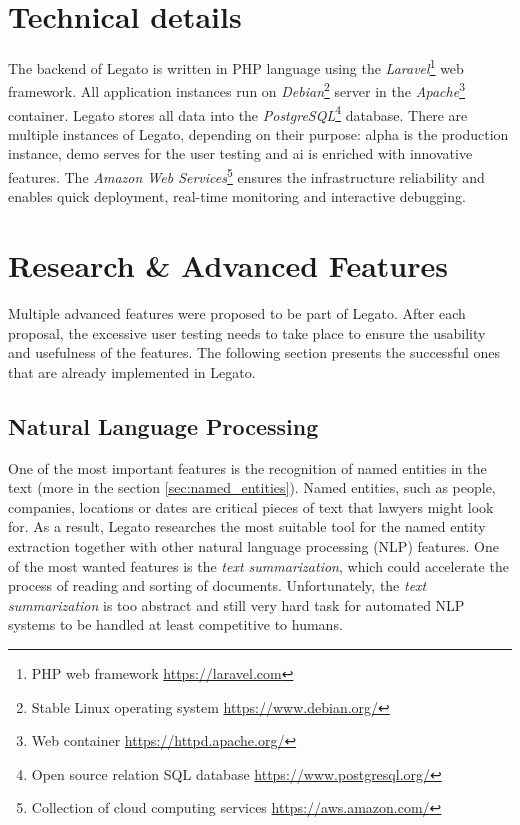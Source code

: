 \documentclass[
  digital, %
  notable,   %
  nolof,     %
  nolot,     %
]{fithesis3}
\begin{document}
\section{Technical details}
The backend of Legato is written in PHP language using the \textit{Laravel}\footnote{PHP web framework \url{https://laravel.com}} web framework.
All application instances run on \textit{Debian}\footnote{Stable Linux operating system \url{https://www.debian.org/}} server in the \textit{Apache}\footnote{Web container \url{https://httpd.apache.org/}} container.
Legato stores all data into the \textit{PostgreSQL}\footnote{Open source relation SQL database \url{https://www.postgresql.org/}} database.
There are multiple instances of Legato, depending on their purpose: alpha is the production instance, demo serves for the user testing and ai is enriched with innovative features.
The \textit{Amazon Web Services}\footnote{Collection of cloud computing services \url{https://aws.amazon.com/}} ensures the infrastructure reliability and enables quick deployment, real-time monitoring and interactive debugging.

\section{Research \& Advanced Features}
\label{sec:legato_advanced}
Multiple advanced features were proposed to be part of Legato.
After each proposal, the excessive user testing needs to take place to ensure the usability and usefulness of the features.
The following section presents the successful ones that are already implemented in Legato.

\subsection*{Natural Language Processing}
One of the most important features is the recognition of named entities in the text (more in the section \ref{sec:named_entities}).
Named entities, such as people, companies, locations or dates are critical pieces of text that lawyers might look for.
As a result, Legato researches the most suitable tool for the named entity extraction together with other natural language processing (NLP) features.
One of the most wanted features is the \textit{text summarization}, which could accelerate the process of reading and sorting of documents.
Unfortunately, the \textit{text summarization} is too abstract and still very hard task for automated NLP systems to be handled at least competitive to humans.
\end{document}
